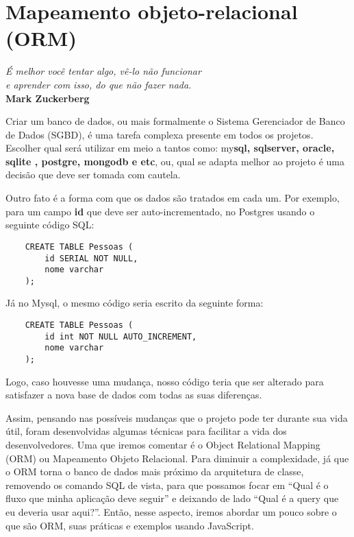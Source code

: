 \chapter{Mapeamento objeto-relacional (ORM)}\label{cap:cap3}

\begin{flushright}
	\textit{
		É melhor você tentar algo, vê-lo não funcionar \\ e aprender com isso, do que não fazer nada.
	} \\
	
	\textbf{Mark Zuckerberg}
\end{flushright}

Criar um banco de dados, ou mais formalmente o Sistema Gerenciador de Banco de Dados (SGBD), é uma tarefa complexa presente em todos os projetos. Escolher qual será utilizar em meio a tantos como: my\textbf{sql, sqlserver, oracle, sqlite , postgre, mongodb e etc}, ou, qual se adapta melhor ao projeto é uma decisão que deve ser tomada com cautela.

Outro fato é a forma com que os dados são tratados em cada um. Por exemplo, para um campo \textbf{id} que deve ser auto-incrementado, no Postgres usando o seguinte código SQL:

\begin{verbatim}
	CREATE TABLE Pessoas (
		id SERIAL NOT NULL,
		nome varchar
	);
\end{verbatim}

Já no Mysql, o mesmo código seria escrito da seguinte forma:

\begin{verbatim}
	CREATE TABLE Pessoas (
		id int NOT NULL AUTO_INCREMENT,
		nome varchar
	);
\end{verbatim}

Logo, caso houvesse uma mudança, nosso código teria que ser alterado para satisfazer a nova base de dados com todas as suas diferenças.

Assim, pensando nas possíveis mudanças que o projeto pode ter durante sua vida útil, foram desenvolvidas algumas técnicas para facilitar a vida dos desenvolvedores. Uma que iremos comentar é o Object Relational Mapping (ORM) ou Mapeamento Objeto Relacional. Para diminuir a complexidade, já que o ORM torna o banco de dados mais próximo da arquitetura de classe, removendo os comando SQL de vista, para que possamos focar em ``Qual é o fluxo que minha aplicação deve seguir'' e deixando de lado ``Qual é a query que eu deveria usar aqui?''. Então, nesse aspecto, iremos abordar um pouco sobre o que são ORM, suas práticas e exemplos usando JavaScript.

